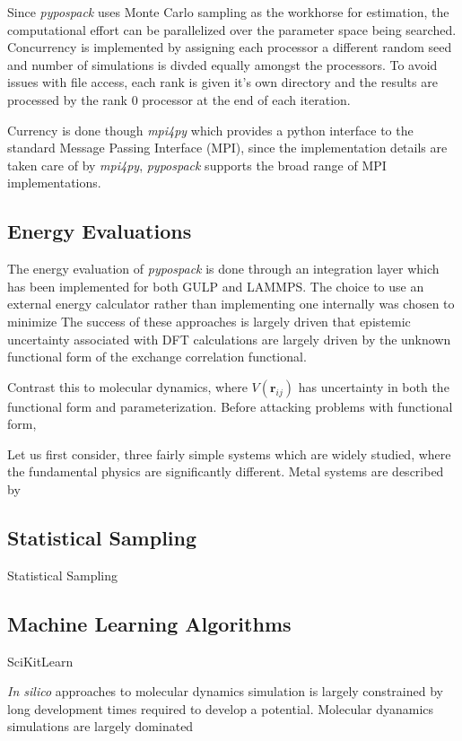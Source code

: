 Since \emph{pypospack} uses Monte Carlo sampling as the workhorse for estimation, the computational effort can be parallelized over the parameter space being searched.  Concurrency is implemented by assigning each processor a different random seed and number of simulations is divded equally amongst the processors.  To avoid issues with file access, each rank is given it's own directory and the results are processed by the rank $0$ processor at the end of each iteration.

Currency is done though \emph{mpi4py} which provides a python interface to the standard Message Passing Interface (MPI), since the implementation details are taken care of by \emph{mpi4py}, \emph{pypospack} supports the broad range of MPI implementations.

\subsection{Energy Evaluations}

The energy evaluation of \emph{pypospack} is done through an integration layer which has been implemented for both GULP and LAMMPS.  The choice to use an external energy calculator rather than implementing one internally was chosen to minimize
The success of these approaches is largely driven that epistemic uncertainty associated with DFT calculations are largely driven by the unknown functional form of the exchange correlation functional.

Contrast this to molecular dynamics, where $V(\bm{r}_{ij})$ has uncertainty in both the functional form and parameterization.  Before attacking problems with functional form,

Let us first consider, three fairly simple systems which are widely studied, where the fundamental physics are significantly different.  Metal systems are described by

\subsection{Statistical Sampling}

Statistical Sampling

\subsection{Machine Learning Algorithms}

SciKitLearn

\emph{In silico} approaches to molecular dynamics simulation is largely constrained by long development times required to develop a potential.  Molecular dyanamics simulations are largely dominated

